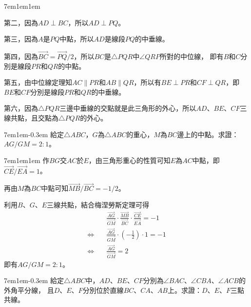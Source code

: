 \documentclass[12pt]{article}
\begin{document}
\begin{mybox}[Answer 1]{7em}{1em}{1em}
\begin{enumerate}[label = 方法 \arabic*：]
        第二，因為$AD\perp BC$，所以$AD\perp PQ$。

        第三，因為$A$是$PQ$中點，所以$AD$是線段$PQ$的中垂線。 

        第四，因為$\overrightarrow{BC}=\overrightarrow{PQ}/2$，所以$BC$是$\triangle{PQR}$中$\angle{QRP}$所對的中位線，
        即有$B$和$C$分別是線段$PR$和$QR$的中點。
        
        第五，由中位線定理知$AC\parallel PR$和$AB\parallel QR$，所以有$BE\perp PR$和$CF\perp QR$，即$BE$和$CF$分別是線段$PR$和$QR$的中垂線。

        第六，因為$\triangle{PQR}$三邊中垂線的交點就是此三角形的外心，所以$AD$、$BE$、$CF$三線共點，且交點為$\triangle{PQR}$的外心。
    \end{enumerate}
\end{mybox}
\begin{mybox}[Problem 2]{7em}{1em}{-0.3em}
   給定$\triangle{ABC}$，$G$為$\triangle{ABC}$的重心，$M$為$BC$邊上的中點。求證：$AG/GM=2:1$。
\end{mybox}
\begin{mybox}[Answer 2]{7em}{1em}{1em}
    作$BG$交$AC$於$E$，由三角形重心的性質可知$E$為$AC$中點，即$\overrightarrow{CE}/\overrightarrow{EA}=1$。

    再由$M$為$BC$中點可知$\overrightarrow{MB}/\overrightarrow{BC}=-1/2$。
    
    利用$B$、$G$、$E$三線共點，結合梅涅勞斯定理可得
    \begin{align*}
        &\frac{\overrightarrow{AG}}{\overrightarrow{GM}}
        \cdot\frac{\overrightarrow{MB}}{\overrightarrow{BC}}
        \cdot\frac{\overrightarrow{CE}}{\overrightarrow{EA}}=-1\\
        \Leftrightarrow\quad&\frac{\overrightarrow{AG}}{\overrightarrow{GM}}\cdot\left(-\frac{1}{2}\right)\cdot 1=-1\\
        \Leftrightarrow\quad&\frac{\overrightarrow{AG}}{\overrightarrow{GM}}=2
    \end{align*}
    即有$AG/GM=2:1$。
\end{mybox}
\begin{mybox}[Problem 3]{7em}{1em}{-0.3em}
   給定$\triangle{ABC}$中，$AD$、$BE$、$CF$分別為$\angle{BAC}$、$\angle{CBA}$、$\angle{ACB}$的外角平分線，
   且$D$、$E$、$F$分別位於直線$BC$、$CA$、$AB$上。求證：$D$、$E$、$F$三點共線。
\end{mybox}
\end{document}
